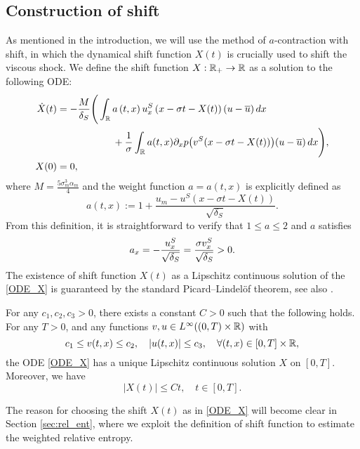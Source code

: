 \documentclass[11pt,reqno]{amsart}
\begin{document}
	\subsection{Construction of shift} As mentioned in the introduction, we will use the method of $a$-contraction with shift, in which the dynamical shift function $X(t)$ is crucially used to shift the viscous shock. We define the shift function $X:\mathbb R_+\to\mathbb R$ as a solution to the following ODE:
	\begin{align}
	\begin{aligned}\label{ODE_X}
	\dot{X}(t)&=-\frac{M}{\delta_S}\Bigg(\int_{\mathbb{R}} a\left(t,x\right) u^S_x\left(x- \sigma t- X(t)\right) (u-\overline{u})\,d x\\
	&\hspace{2cm}+\frac{1}{\sigma}\int_{\mathbb{R}} a(t,x)\partial_xp\big(v^S(x- \sigma t- X(t))\big) (u-\overline{u} )\,d x\Bigg),\\
 X(0)&=0,
	\end{aligned}
	\end{align}
	where $M=\frac{5\sigma_m^3\alpha_m}{4}$ and the weight function $a=a(t,x)$ is explicitly
    defined as
\begin{equation} \label{a}
	a(t,x):=1+\frac{u_m-u^S(x-\sigma t-X(t))}{\sqrt{\delta_S}}.
\end{equation}
From this definition, it is straightforward to verify that $1\le a\le 2$ and $a$ satisfies
\begin{equation}\label{a_x}
	a_x=-\frac{u^S_x}{\sqrt{\delta_S}}=\frac{\sigma v^S_x}{\sqrt{\delta_S}}>0.
\end{equation}
The existence of shift function $X(t)$ as a Lipschitz continuous solution of the \eqref{ODE_X} is guaranteed by the standard Picard–Lindel\"of theorem, see also \cite[Lemma 3.3]{ KVW23}.

    	\begin{proposition} \cite{ KVW23}
		For any $c_1,c_2,c_3>0$, there exists a constant $C>0$ such that the following holds. For any $T>0$, and any functions $v,u\in L^\infty((0,T)\times\mathbb{R})$ with
		\[c_1\le v(t,x)\le c_2,\quad |u(t,x)|\le c_3,\quad \forall (t,x)\in[0,T]\times\mathbb{R},\]
		the ODE \eqref{ODE_X} has a unique Lipschitz continuous solution $X$ on $[0,T]$. Moreover, we have
		\[|X(t)|\le Ct,\quad t\in[0,T].\]
	\end{proposition}

The reason for choosing the shift $X(t)$ as in \eqref{ODE_X} will become clear in Section \ref{sec:rel_ent}, where we exploit the definition of shift function to estimate the weighted relative entropy.
\end{document}
